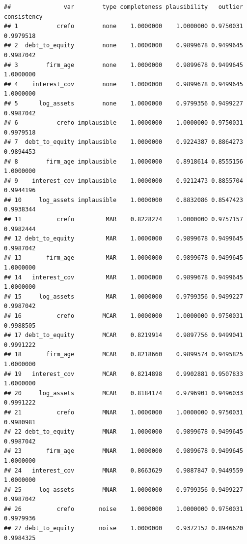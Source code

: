\documentclass[
]{article}
\newenvironment{Shaded}{\begin{snugshade}}{\end{snugshade}}
\newcommand{\NormalTok}[1]{#1}
\newcommand{\SpecialCharTok}[1]{\textcolor[rgb]{0.81,0.36,0.00}{\textbf{#1}}}
\begin{document}
\begin{Shaded}
\end{Shaded}

\begin{verbatim}
##               var        type completeness plausibility   outlier consistency
## 1           crefo        none    1.0000000    1.0000000 0.9750031   0.9979518
## 2  debt_to_equity        none    1.0000000    0.9899678 0.9499645   0.9987042
## 3        firm_age        none    1.0000000    0.9899678 0.9499645   1.0000000
## 4    interest_cov        none    1.0000000    0.9899678 0.9499645   1.0000000
## 5      log_assets        none    1.0000000    0.9799356 0.9499227   0.9987042
## 6           crefo implausible    1.0000000    1.0000000 0.9750031   0.9979518
## 7  debt_to_equity implausible    1.0000000    0.9224387 0.8864273   0.9894453
## 8        firm_age implausible    1.0000000    0.8918614 0.8555156   1.0000000
## 9    interest_cov implausible    1.0000000    0.9212473 0.8855704   0.9944196
## 10     log_assets implausible    1.0000000    0.8832086 0.8547423   0.9938344
## 11          crefo         MAR    0.8228274    1.0000000 0.9757157   0.9982444
## 12 debt_to_equity         MAR    1.0000000    0.9899678 0.9499645   0.9987042
## 13       firm_age         MAR    1.0000000    0.9899678 0.9499645   1.0000000
## 14   interest_cov         MAR    1.0000000    0.9899678 0.9499645   1.0000000
## 15     log_assets         MAR    1.0000000    0.9799356 0.9499227   0.9987042
## 16          crefo        MCAR    1.0000000    1.0000000 0.9750031   0.9988505
## 17 debt_to_equity        MCAR    0.8219914    0.9897756 0.9499041   0.9991222
## 18       firm_age        MCAR    0.8218660    0.9899574 0.9495825   1.0000000
## 19   interest_cov        MCAR    0.8214898    0.9902881 0.9507833   1.0000000
## 20     log_assets        MCAR    0.8184174    0.9796901 0.9496033   0.9991222
## 21          crefo        MNAR    1.0000000    1.0000000 0.9750031   0.9980981
## 22 debt_to_equity        MNAR    1.0000000    0.9899678 0.9499645   0.9987042
## 23       firm_age        MNAR    1.0000000    0.9899678 0.9499645   1.0000000
## 24   interest_cov        MNAR    0.8663629    0.9887847 0.9449559   1.0000000
## 25     log_assets        MNAR    1.0000000    0.9799356 0.9499227   0.9987042
## 26          crefo       noise    1.0000000    1.0000000 0.9750031   0.9979936
## 27 debt_to_equity       noise    1.0000000    0.9372152 0.8946620   0.9984325

\end{verbatim}
\end{document}
